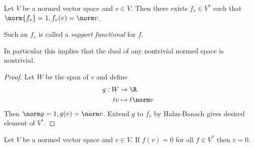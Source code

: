 \documentclass[a4paper]{article}
\begin{document}
\begin{corollary}
  Let \(V\) be a normed vector space and \(v \in V\). Then there exists \(f_v \in V^*\) such that \(\norm{f_v} = 1, f_v(v) = \norm v\).

  Such an \(f_v\) is called a \emph{support functional} for \(f\).
\end{corollary}

In particular this implies that the dual of any nontrivial normed space is nontrivial.

\begin{proof}
  Let \(W\) be the span of \(v\) and define
  \begin{align*}
    g: W &\to \R \\
    tv &\mapsto t \norm v
  \end{align*}
  Then \(\norm g = 1, g(v) = \norm v\). Extend \(g\) to \(f_v\) by Hahn-Banach gives desired element of \(V^*\).
\end{proof}

\begin{corollary}
  Let \(V\) be a normed vector space and \(v \in V\). If \(f(v) = 0\) for all \(f \in V^*\) then \(v = 0\).
\end{corollary}

\printindex
\end{document}
